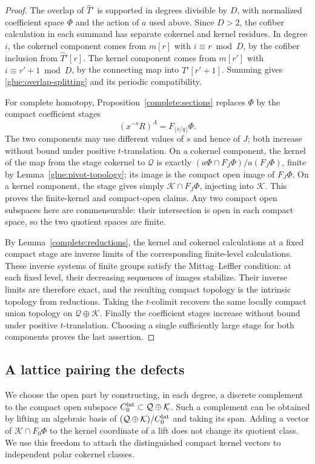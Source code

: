 \begin{proof}
The overlap of $\widehat T'$ is supported in degrees divisible by
$D$, with normalized coefficient space $\Phi$ and the action of $a$
used above. Since $D>2$, the cofiber calculation in each summand has
separate cokernel and kernel residues. In degree $i$, the cokernel
component comes from $m[r]$ with $i\equiv r\bmod D$, by the cofiber
inclusion from $\widehat T'[r]$. The kernel component comes from
$m[r']$ with $i\equiv r'+1\bmod D$, by the connecting map into
$\widehat T'[r'+1]$. Summing gives
\eqref{glue:overlap-splitting} and its periodic compatibility.

For complete homotopy, Proposition~\ref{complete:sections} replaces
$\Phi$ by the compact coefficient stages
\[
 (x^{-s}R)^\Lambda=F_{\lfloor s/q\rfloor}\Phi.
\]
The two components may use different values of $s$ and hence of $J$;
both increase without bound under positive $t$-translation.
On a cokernel component, the kernel of the map from the stage
cokernel to $\mathcal Q$ is exactly
$(a\Phi\cap F_J\Phi)/a(F_J\Phi)$, finite by
Lemma~\ref{glue:pivot-topology}; its image is the compact open image
of $F_J\Phi$. On a kernel component, the stage gives simply
$\mathcal K\cap F_J\Phi$, injecting into $\mathcal K$. This proves
the finite-kernel and compact-open claims. Any two compact open
subspaces here are commensurable: their intersection is open in each
compact space, so the two quotient spaces are finite.

By Lemma~\ref{complete:reductions}, the kernel and cokernel
calculations at a fixed compact stage are inverse limits of the
corresponding finite-level calculations. These inverse systems of
finite groups satisfy the Mittag--Leffler condition: at each fixed
level, their decreasing sequences of images stabilize. Their
inverse limits are therefore exact, and the resulting compact
topology is the intrinsic topology from reductions. Taking the
$t$-colimit recovers the same locally compact union topology on
$\mathcal Q\oplus\mathcal K$.
Finally the coefficient stages increase without bound under positive
$t$-translation. Choosing a single sufficiently large stage for both
components proves the last assertion.
\end{proof}

\subsection{A lattice pairing the defects}

We choose the open part by constructing, in each degree, a discrete
complement to the compact open subspace
$C_0^{\rm lat}\subset\mathcal Q\oplus\mathcal K$.
Such a complement can be obtained by lifting an algebraic basis of
$(\mathcal Q\oplus\mathcal K)/C_0^{\rm lat}$ and taking its span.
Adding a vector of $\mathcal K\cap F_0\Phi$ to the kernel coordinate
of a lift does not change its quotient class. We use this freedom to
attach the distinguished compact kernel vectors to independent polar
cokernel classes.

